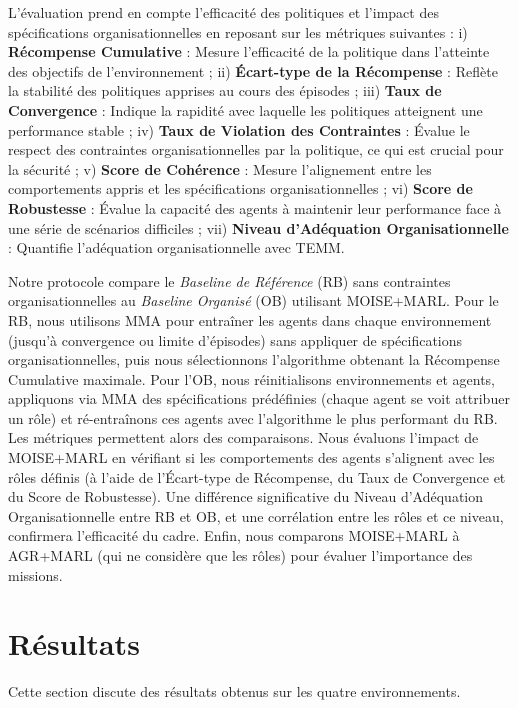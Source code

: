 \documentclass[francais,ROIA,Unicode,manuscript]{cedram}
\begin{document}
L'évaluation prend en compte l'efficacité des politiques et l'impact des spécifications organisationnelles en reposant sur les métriques suivantes :
%
i) \textbf{Récompense Cumulative} : Mesure l'efficacité de la politique dans l'atteinte des objectifs de l'environnement
; \quad
ii) \textbf{Écart-type de la Récompense} : Reflète la stabilité des politiques apprises au cours des épisodes
; \quad
iii) \textbf{Taux de Convergence} : Indique la rapidité avec laquelle les politiques atteignent une performance stable
; \quad
iv) \textbf{Taux de Violation des Contraintes} : Évalue le respect des contraintes organisationnelles par la politique, ce qui est crucial pour la sécurité
; \quad
v) \textbf{Score de Cohérence} : Mesure l'alignement entre les comportements appris et les spécifications organisationnelles
; \quad
vi) \textbf{Score de Robustesse} : Évalue la capacité des agents à maintenir leur performance face à une série de scénarios difficiles
; \quad
vii) \textbf{Niveau d'Adéquation Organisationnelle} : Quantifie l'adéquation organisationnelle avec TEMM.

Notre protocole compare le \textit{Baseline de Référence} (RB) sans contraintes organisationnelles au \textit{Baseline Organisé} (OB) utilisant MOISE+MARL.
Pour le RB, nous utilisons MMA pour entraîner les agents dans chaque environnement (jusqu'à convergence ou limite d'épisodes) sans appliquer de spécifications organisationnelles, puis nous sélectionnons l'algorithme obtenant la Récompense Cumulative maximale.
Pour l'OB, nous réinitialisons environnements et agents, appliquons via MMA des spécifications prédéfinies (chaque agent se voit attribuer un rôle) et ré-entraînons ces agents avec l'algorithme le plus performant du RB. Les métriques permettent alors des comparaisons.
%
Nous évaluons l'impact de MOISE+MARL en vérifiant si les comportements des agents s'alignent avec les rôles définis (à l'aide de l'Écart-type de Récompense, du Taux de Convergence et du Score de Robustesse). Une différence significative du Niveau d'Adéquation Organisationnelle entre RB et OB, et une corrélation entre les rôles et ce niveau, confirmera l'efficacité du cadre.
Enfin, nous comparons MOISE+MARL à AGR+MARL (qui ne considère que les rôles) pour évaluer l'importance des missions.

\section{Résultats}
\label{sec:results}

Cette section discute des résultats obtenus sur les quatre environnements.
\end{document}
